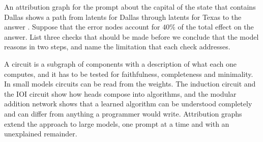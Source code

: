 \begin{exercise}\label{ex:graphcritique}
An attribution graph for the prompt about the capital of the state that contains Dallas shows a path from latents
for Dallas through latents for Texas to the answer . Suppose that the error nodes account for $40\%$
of the total effect on the answer. List three checks that should be made before we conclude that the model
reasons in two steps, and name the limitation that each check addresses.
\end{exercise}

\begin{takeaways}
A circuit is a subgraph of components with a description of what each one computes, and it has to be tested
for faithfulness, completeness and minimality. In small models circuits can be read from the weights. The
induction circuit and the IOI circuit show how heads compose into algorithms, and the modular addition network
shows that a learned algorithm can be understood completely and can differ from anything a programmer would
write. Attribution graphs extend the approach to large models, one prompt at a time and with an unexplained
remainder.
\end{takeaways}

